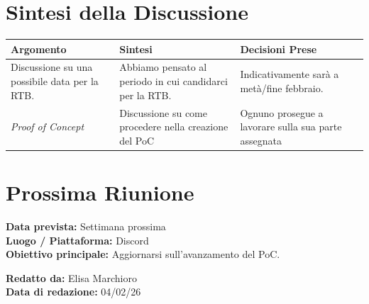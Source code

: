 \documentclass[a4paper,12pt]{article}
\begin{document}
\section*{ Sintesi della Discussione}

\begin{longtable}{|p{}|p{}|p{}|}
\hline
\textbf{Argomento} & \textbf{Sintesi} & \textbf{Decisioni Prese} \\ \hline
Discussione su una possibile data per la RTB. & Abbiamo pensato al periodo in cui candidarci per la RTB. & Indicativamente sarà a metà/fine febbraio. \\ \hline
\textit{Proof of Concept} & Discussione su come procedere nella creazione del PoC & Ognuno prosegue a lavorare sulla sua parte assegnata \\ \hline
\end{longtable}

\section*{ Prossima Riunione}
\textbf{Data prevista:} Settimana prossima \\
\textbf{Luogo / Piattaforma:} Discord \\
\textbf{Obiettivo principale:} Aggiornarsi sull'avanzamento del PoC.


\textbf{Redatto da:} Elisa Marchioro \\
\textbf{Data di redazione:} 04/02/26
\end{document}
